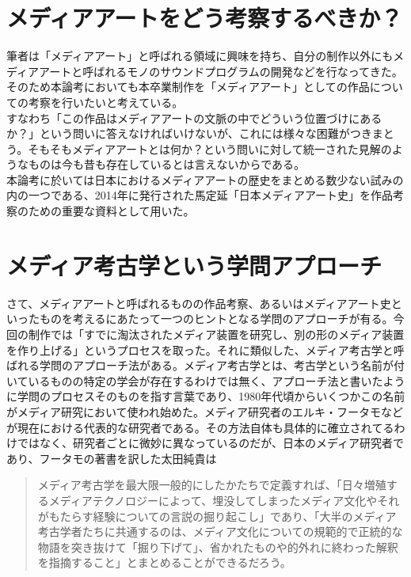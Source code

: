 \section{メディアアートをどう考察するべきか？}\label{ux30e1ux30c7ux30a3ux30a2ux30a2ux30fcux30c8ux3092ux3069ux3046ux8003ux5bdfux3059ux308bux3079ux304dux304b}

筆者は「メディアアート」と呼ばれる領域に興味を持ち、自分の制作以外にもメディアアートと呼ばれるモノのサウンドプログラムの開発などを行なってきた。\\
そのため本論考においても本卒業制作を「メディアアート」としての作品についての考察を行いたいと考えている。\\
すなわち「この作品はメディアアートの文脈の中でどういう位置づけにあるか？」という問いに答えなければいけないが、これには様々な困難がつきまとう。そもそもメディアアートとは何か？という問いに対して統一された見解のようなものは今も昔も存在しているとは言えないからである。\\
本論考に於いては日本におけるメディアアートの歴史をまとめる数少ない試みの内の一つである、2014年に発行された馬定延「日本メディアアート史」を作品考察のための重要な資料として用いた。

\section{メディア考古学という学問アプローチ}\label{ux30e1ux30c7ux30a3ux30a2ux8003ux53e4ux5b66ux3068ux3044ux3046ux5b66ux554fux30a2ux30d7ux30edux30fcux30c1}

さて、メディアアートと呼ばれるものの作品考察、あるいはメディアアート史といったものを考えるにあたって一つのヒントとなる学問のアプローチが有る。今回の制作では「すでに淘汰されたメディア装置を研究し、別の形のメディア装置を作り上げる」というプロセスを取った。それに類似した、メディア考古学と呼ばれる学問のアプローチ法がある。メディア考古学とは、考古学という名前が付いているものの特定の学会が存在するわけでは無く、アプローチ法と書いたように学問のプロセスそのものを指す言葉であり、1980年代頃からいくつかこの名前がメディア研究において使われ始めた。メディア研究者のエルキ・フータモなどが現在における代表的な研究者である。その方法自体も具体的に確立されてるわけではなく、研究者ごとに微妙に異なっているのだが、日本のメディア研究者であり、フータモの著書を訳した太田純貴は

\begin{quote}
メディア考古学を最大限一般的にしたかたちで定義すれば、「日々増殖するメディアテクノロジーによって、埋没してしまったメディア文化やそれがもたらす経験についての言説の掘り起こし」であり、「大半のメディア考古学者たちに共通するのは、メディア文化についての規範的で正統的な物語を突き抜けて「掘り下げて」、省かれたものや的外れに終わった解釈を指摘すること」とまとめることができるだろう。
\end{quote}

